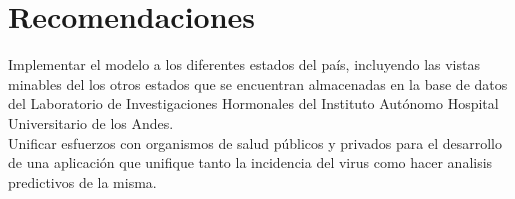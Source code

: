 \section{Recomendaciones}

Implementar el modelo a los diferentes estados del pa\'is, incluyendo las vistas minables del los otros estados que se encuentran almacenadas en la base de datos del Laboratorio de Investigaciones Hormonales del Instituto Aut\'onomo Hospital Universitario de los Andes.\\

Unificar esfuerzos con organismos de salud p\'ublicos y privados para el desarrollo de una aplicaci\'on que unifique tanto la incidencia del virus como hacer analisis predictivos de la misma.\\



 

